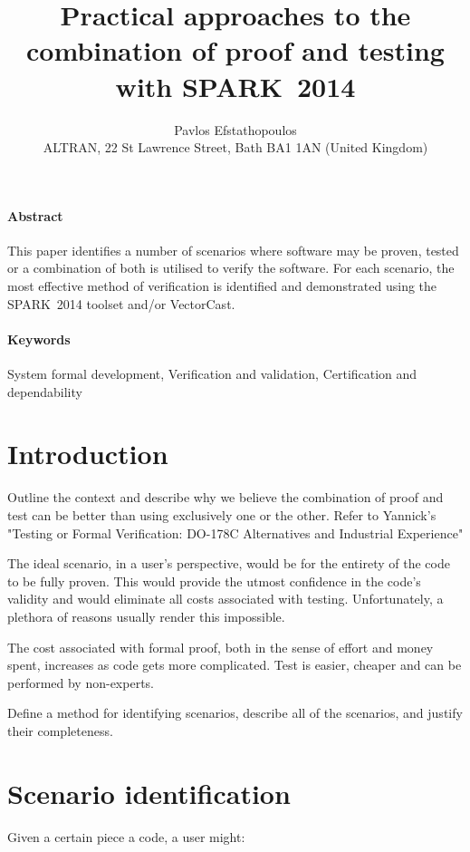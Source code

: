 \documentclass{article}
\newcommand{\newspark}{SPARK~2014\xspace}
\begin{document}
\title{Practical approaches to the combination of proof and testing with \newspark}

\author{%
\large Pavlos Efstathopoulos\\
\normalsize ALTRAN, 22 St Lawrence Street, Bath BA1 1AN (United Kingdom)}

\date{}

\maketitle

\paragraph{Abstract}
This paper identifies a number of scenarios where software may
be proven, tested or a combination of both is utilised to verify the
software. For each scenario, the most effective method of verification
is identified and demonstrated using the \newspark toolset and/or
VectorCast.

\paragraph{Keywords}
System formal development, Verification and validation,
Certification and dependability

\section{Introduction}
Outline the context and describe why we believe the combination of proof
and test can be better than using exclusively one or the other. Refer to Yannick's
"Testing or Formal Verification: DO-178C Alternatives and Industrial Experience"

The ideal scenario, in a user's perspective, would be for the entirety of the code
to be fully proven. This would provide the utmost confidence in the code's validity
and would eliminate all costs associated with testing. Unfortunately, a plethora of
reasons usually render this impossible.

The cost associated with formal proof, both in the sense of effort and money spent,
increases as code gets more complicated. Test is easier, cheaper and can be performed
by non-experts.

Define a method for identifying scenarios, describe all of the scenarios,
and justify their completeness.


\section{Scenario identification}
Given a certain piece a code, a user might:
\end{document}
